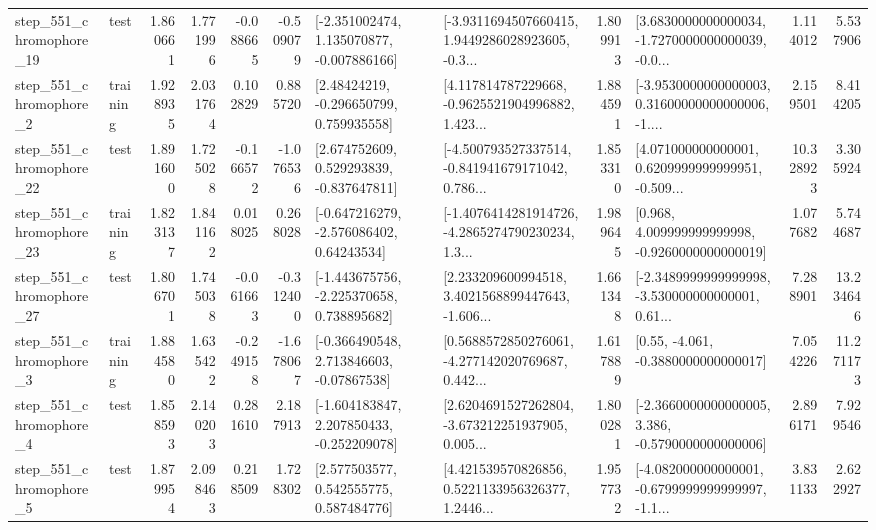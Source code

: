 \begin{tabular}{llrrrrllrlrr}
  step\_551\_chromophore\_19 &      test &      1.860661 &    1.771996 &     -0.088665 & -0.509079 &   [-2.351002474, 1.135070877, -0.007886166] &  [-3.9311694507660415, 1.9449286028923605, -0.3... &       1.809913 &  [3.6830000000000034, -1.7270000000000039, -0.0... &            1.114012 &          5.537906 \\
   step\_551\_chromophore\_2 &  training &      1.928935 &    2.031764 &      0.102829 &  0.885720 &     [2.48424219, -0.296650799, 0.759935558] &  [4.117814787229668, -0.9625521904996882, 1.423... &       1.884591 &  [-3.9530000000000003, 0.31600000000000006, -1.... &            2.159501 &          8.414205 \\
  step\_551\_chromophore\_22 &      test &      1.891600 &    1.725028 &     -0.166572 & -1.076536 &    [2.674752609, 0.529293839, -0.837647811] &  [-4.500793527337514, -0.841941679171042, 0.786... &       1.853310 &  [4.071000000000001, 0.6209999999999951, -0.509... &           10.328923 &          3.305924 \\
  step\_551\_chromophore\_23 &  training &      1.823137 &    1.841162 &      0.018025 &  0.268028 &    [-0.647216279, -2.576086402, 0.64243534] &  [-1.4076414281914726, -4.2865274790230234, 1.3... &       1.989645 &    [0.968, 4.009999999999998, -0.9260000000000019] &            1.077682 &          5.744687 \\
  step\_551\_chromophore\_27 &      test &      1.806701 &    1.745038 &     -0.061663 & -0.312400 &   [-1.443675756, -2.225370658, 0.738895682] &  [2.233209600994518, 3.4021568899447643, -1.606... &       1.661348 &  [-2.3489999999999998, -3.530000000000001, 0.61... &            7.288901 &         13.234646 \\
   step\_551\_chromophore\_3 &  training &      1.884580 &    1.635422 &     -0.249158 & -1.678067 &    [-0.366490548, 2.713846603, -0.07867538] &  [0.5688572850276061, -4.277142020769687, 0.442... &       1.617889 &                [0.55, -4.061, -0.3880000000000017] &            7.054226 &         11.271173 \\
   step\_551\_chromophore\_4 &      test &      1.858593 &    2.140203 &      0.281610 &  2.187913 &   [-1.604183847, 2.207850433, -0.252209078] &  [2.6204691527262804, -3.673212251937905, 0.005... &       1.800281 &  [-2.3660000000000005, 3.386, -0.5790000000000006] &            2.896171 &          7.929546 \\
   step\_551\_chromophore\_5 &      test &      1.879954 &    2.098463 &      0.218509 &  1.728302 &     [2.577503577, 0.542555775, 0.587484776] &  [4.421539570826856, 0.5221133956326377, 1.2446... &       1.957732 &  [-4.082000000000001, -0.6799999999999997, -1.1... &            3.831133 &          2.622927 \\

\end{tabular}
